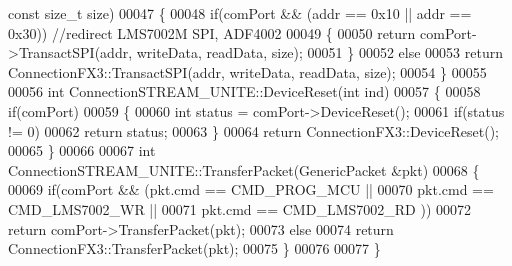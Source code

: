 \begin{DoxyCode}
{      const} \textcolor{keywordtype}{size\_t} size)
00047 \{
00048     \textcolor{keywordflow}{if}(comPort && (addr == 0x10 || addr == 0x30)) \textcolor{comment}{//redirect LMS7002M SPI, ADF4002}
00049     \{
00050         \textcolor{keywordflow}{return} comPort->TransactSPI(addr, writeData, readData, size);
00051     \}
00052     \textcolor{keywordflow}{else}
00053         \textcolor{keywordflow}{return} ConnectionFX3::TransactSPI(addr, writeData, readData, size);
00054 \}
00055 
00056 \textcolor{keywordtype}{int} ConnectionSTREAM_UNITE::DeviceReset(\textcolor{keywordtype}{int} ind)
00057 \{
00058     \textcolor{keywordflow}{if}(comPort)
00059     \{
00060         \textcolor{keywordtype}{int} status = comPort->DeviceReset();
00061         \textcolor{keywordflow}{if}(status != 0)
00062             \textcolor{keywordflow}{return} status;
00063     \}
00064     \textcolor{keywordflow}{return} ConnectionFX3::DeviceReset();
00065 \}
00066 
00067 \textcolor{keywordtype}{int} ConnectionSTREAM_UNITE::TransferPacket(GenericPacket &pkt)
00068 \{
00069     \textcolor{keywordflow}{if}(comPort && (pkt.cmd == CMD_PROG_MCU ||
00070                    pkt.cmd == CMD_LMS7002_WR ||
00071                    pkt.cmd == CMD_LMS7002_RD ))
00072         \textcolor{keywordflow}{return} comPort->TransferPacket(pkt);
00073     \textcolor{keywordflow}{else}
00074         \textcolor{keywordflow}{return} ConnectionFX3::TransferPacket(pkt);
00075 \}
00076 
00077 \}
\end{DoxyCode}
